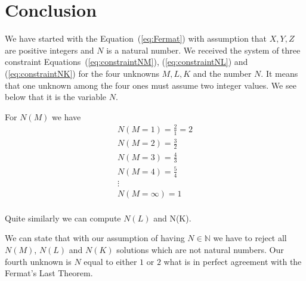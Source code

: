 \documentclass[SecEq,CM,GP]{degruyter-crelle} %
\theoremstyle{plain}
\theoremstyle{definition}
\begin{document}
\section{Conclusion}\label{sec:conclusion}

We have started with the Equation~(\ref{eq:Fermat}) with assumption that $X, Y, Z$ are positive 
integers and $N$ is a natural number.
We received the system of three constraint Equations~(\ref{eq:constraintNM}), (\ref{eq:constraintNL}) and (\ref{eq:constraintNK})
for the four unknowns $M, L, K$ and the number $N$\@.
It means that one unknown among the four ones must assume two integer values. We see below that it is the variable $N$\@.

For $N(M)$ we have
\begin{eqnarray}
\label{eq:constraint}
N(M=1) = \frac{2}{1} = 2    \\ \nonumber
N(M=2) = \frac{3}{2}        \\ \nonumber
N(M=3) = \frac{4}{3}        \\ \nonumber
N(M=4) = \frac{5}{4}        \\ \nonumber
\vdots                      \\ \nonumber
N(M=\infty) = 1             \\ \nonumber
\end{eqnarray}


Quite similarly we can compute $N(L)$ and N(K)\@.

We can state that with our assumption of having $N \in \mathbb{N}$ we have to reject
all $N(M)$, $N(L)$ and $N(K)$ solutions which are not natural numbers.
Our fourth unknown is $N$ equal to either $1$ or $2$ what is in perfect agreement with the Fermat's Last Theorem.




\end{document}

